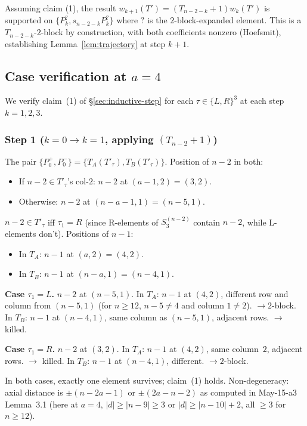 \documentclass[11pt]{article}
\theoremstyle{definition}
\begin{document}
Assuming claim (1), the result $w_{k+1}(T')=(T_{n-2-k}{+}1)w_k(T')$ is
supported on $\{P_k^?, s_{n-2-k}P_k^?\}$ where $?$ is the
$2$-block-expanded element.  This is a $T_{n-2-k}$-$2$-block by
construction, with both coefficients nonzero (Hoefsmit), establishing
Lemma~\ref{lem:trajectory} at step $k+1$.

\subsection{Case verification at $a=4$}\label{sec:case-verification}

We verify claim~(1) of \S\ref{sec:inductive-step} for each
$\tau\in\{L,R\}^3$ at each step $k=1,2,3$.

\subsubsection*{Step 1 ($k=0\to k=1$, applying $(T_{n-2}{+}1)$)}

The pair $\{P_0^+,P_0^-\}=\{T_A(T'_\tau),T_B(T'_\tau)\}$.  Position of
$n-2$ in both:
\begin{itemize}[leftmargin=2em,topsep=0.3em,itemsep=0.2em]
\item If $n-2\in T'_\tau$'s col-$2$: $n-2$ at $(a-1,2)=(3,2)$.
\item Otherwise: $n-2$ at $(n-a-1,1)=(n-5,1)$.
\end{itemize}
$n-2\in T'_\tau$ iff $\tau_1=R$ (since R-elements of $S_3^{(n-2)}$
contain $n-2$, while L-elements don't).  Positions of $n-1$:
\begin{itemize}[leftmargin=2em,topsep=0.3em,itemsep=0.2em]
\item In $T_A$: $n-1$ at $(a,2)=(4,2)$.
\item In $T_B$: $n-1$ at $(n-a,1)=(n-4,1)$.
\end{itemize}

\textbf{Case $\tau_1=L$.}  $n-2$ at $(n-5,1)$.  In $T_A$: $n-1$ at
$(4,2)$, different row and column from $(n-5,1)$ (for $n\ge 12$,
$n-5\ne 4$ and column $1\ne 2$).  $\to 2$-block.  In $T_B$: $n-1$ at
$(n-4,1)$, same column as $(n-5,1)$, adjacent rows.  $\to$ killed.

\textbf{Case $\tau_1=R$.}  $n-2$ at $(3,2)$.  In $T_A$: $n-1$ at
$(4,2)$, same column~$2$, adjacent rows.  $\to$ killed.  In $T_B$:
$n-1$ at $(n-4,1)$, different.  $\to 2$-block.

In both cases, exactly one element survives; claim~(1) holds.
Non-degeneracy: axial distance is $\pm(n-2a-1)$ or $\pm(2a-n-2)$ as
computed in May-15-a3 Lemma~3.1 (here at $a=4$, $|d|\ge|n-9|\ge 3$ or
$|d|\ge|n-10|+2$, all $\ge 3$ for $n\ge 12$).
\end{document}

